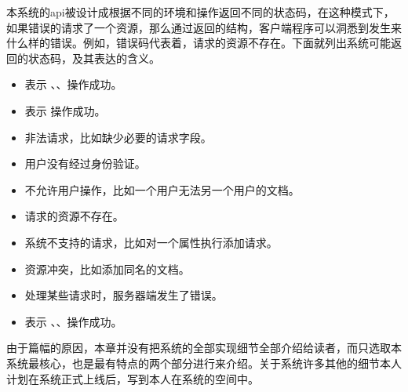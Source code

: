 本系统的api被设计成根据不同的环境和操作返回不同的状态码，在这种模式下，如果错误的请求了一个资源，那么通过返回的结构，客户端程序可以洞悉到发生来什么样的错误。例如，错误码代表着，请求的资源不存在。下面就列出系统可能返回的状态码，及其表达的含义。
\begin{itemize}
\item {} 表示 、、操作成功。
\item {} 表示 操作成功。
\item {} 非法请求，比如缺少必要的请求字段。
\item {} 用户没有经过身份验证。
\item {} 不允许用户操作，比如一个用户无法另一个用户的文档。
\item {} 请求的资源不存在。
\item {} 系统不支持的请求，比如对一个属性执行添加请求。
\item {} 资源冲突，比如添加同名的文档。
\item {} 处理某些请求时，服务器端发生了错误。
\item {} 表示 、、操作成功。
\end{itemize}


由于篇幅的原因，本章并没有把系统的全部实现细节全部介绍给读者，而只选取本系统最核心，也是最有特点的两个部分进行来介绍。关于系统许多其他的细节本人计划在系统正式上线后，写到本人在系统的空间中。